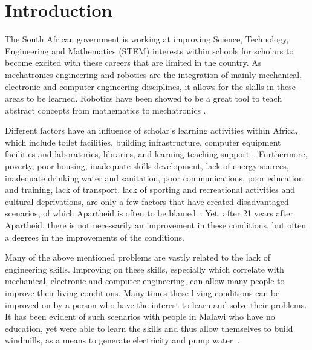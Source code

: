 \documentclass{intech-journal}
\begin{document}
\maketitle

\articleabstract{}

\section{Introduction}
The South African government is working at improving Science, Technology, Engineering and Mathematics (STEM) interests within schools for scholars to become excited with these careers that are limited in the country. 
As mechatronics engineering and robotics are the integration of mainly mechanical, electronic and computer engineering disciplines, it allows for the skills in these areas to be learned. 
Robotics have been showed to be a great tool to teach abstract concepts from mathematics to mechatronics \cite{benitti2012exploring}.



Different factors have an influence of scholar's learning activities within Africa, which include toilet facilities, building infrastructure, computer equipment facilities and laboratories,  libraries, and learning teaching support~\cite{sedibe2011inequality}. Furthermore, poverty, poor housing, inadequate skills development, lack of energy sources, inadequate drinking water and sanitation, poor communications, poor education and training, lack of transport, lack of sporting and recreational activities and cultural deprivations, are only a few factors that have created disadvantaged scenarios, of which Apartheid is often to be blamed~\cite{mokoena2009improving}. Yet, after 21 years after Apartheid, there is not necessarily an improvement in these conditions, but often a degrees in the improvements of the conditions.

Many of the above mentioned problems are vastly related to the lack of engineering skills. Improving on these skills, especially which correlate with mechanical, electronic and computer engineering, can allow many people to improve their living conditions. Many times these living conditions can be improved on by a person who have the interest to learn and solve their problems. It has been evident of such scenarios with people in Malawi who have no education, yet were able to learn the skills and thus allow themselves to build windmills, as a means to generate electricity and pump water~\cite{Sheerin2009}.
\end{document}
